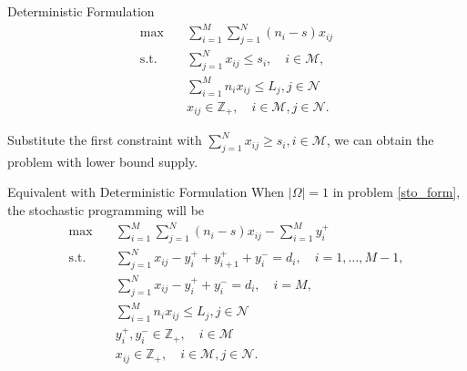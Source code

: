 \begin{frame}{Deterministic Formulation}
  \begin{equation}\label{deter_upper}
    \begin{aligned}
    \max \quad & \sum_{i=1}^{M}  \sum_{j= 1}^{N} (n_i- s) x_{ij} \\
    \text {s.t.} \quad & \sum_{j= 1}^{N} x_{ij} \leq s_{i}, \quad i \in \mathcal{M}, \\
    & \sum_{i=1}^{M} n_{i} x_{ij} \leq L_j, j \in \mathcal{N} \\
    & x_{ij} \in \mathbb{Z}_{+}, \quad i \in \mathcal{M}, j \in \mathcal{N}.
    \end{aligned}
  \end{equation}

  Substitute the first constraint with $\sum_{j= 1}^{N} x_{ij} \geq s_{i}, i \in \mathcal{M}$, we can obtain the problem with lower bound supply. \label{deter_lower}
\end{frame}

  \begin{frame}{Equivalent with Deterministic Formulation}
    When $|\Omega| =1$ in problem \eqref{sto_form}, the stochastic programming will be 
    \small
    \begin{equation}\label{one_form}
      \begin{aligned}
      \max \quad & \sum_{i=1}^{M}  \sum_{j= 1}^{N} (n_i-s) x_{ij} - \sum_{i=1}^{M} y_{i}^{+}  \\
      \text {s.t.} \quad & \sum_{j= 1}^{N} x_{ij} - y_{i}^{+}+ y_{i+1}^{+} + y_{i}^{-} = d_{i}, \quad i = 1,\ldots, M-1, \\
      & \sum_{j= 1}^{N} x_{ij} -y_{i}^{+} + y_{i}^{-} = d_{i}, \quad i = M, \\
      & \sum_{i=1}^{M} n_{i} x_{ij} \leq L_j, j \in \mathcal{N}\\
      & y_{i}^{+}, y_{i}^{-} \in \mathbb{Z}_{+}, \quad i \in \mathcal{M} \\
      & x_{ij} \in \mathbb{Z}_{+}, \quad i \in \mathcal{M}, j \in \mathcal{N}.
      \end{aligned}
    \end{equation}
  \end{frame}



